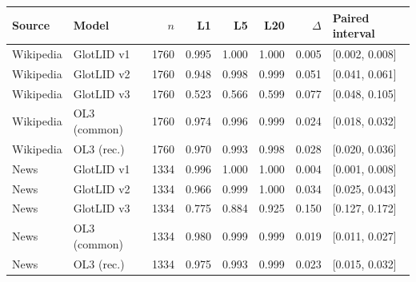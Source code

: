 \begin{tabular}{llrrrrrl}
\toprule
Source & Model & $n$ & L1 & L5 & L20 & $\Delta$ & Paired interval \\
\midrule
Wikipedia & GlotLID v1 & 1760 & 0.995 & 1.000 & 1.000 & 0.005 & [0.002, 0.008] \\
Wikipedia & GlotLID v2 & 1760 & 0.948 & 0.998 & 0.999 & 0.051 & [0.041, 0.061] \\
Wikipedia & GlotLID v3 & 1760 & 0.523 & 0.566 & 0.599 & 0.077 & [0.048, 0.105] \\
Wikipedia & OL3 (common) & 1760 & 0.974 & 0.996 & 0.999 & 0.024 & [0.018, 0.032] \\
Wikipedia & OL3 (rec.) & 1760 & 0.970 & 0.993 & 0.998 & 0.028 & [0.020, 0.036] \\
News & GlotLID v1 & 1334 & 0.996 & 1.000 & 1.000 & 0.004 & [0.001, 0.008] \\
News & GlotLID v2 & 1334 & 0.966 & 0.999 & 1.000 & 0.034 & [0.025, 0.043] \\
News & GlotLID v3 & 1334 & 0.775 & 0.884 & 0.925 & 0.150 & [0.127, 0.172] \\
News & OL3 (common) & 1334 & 0.980 & 0.999 & 0.999 & 0.019 & [0.011, 0.027] \\
News & OL3 (rec.) & 1334 & 0.975 & 0.993 & 0.999 & 0.023 & [0.015, 0.032] \\
\bottomrule
\end{tabular}
